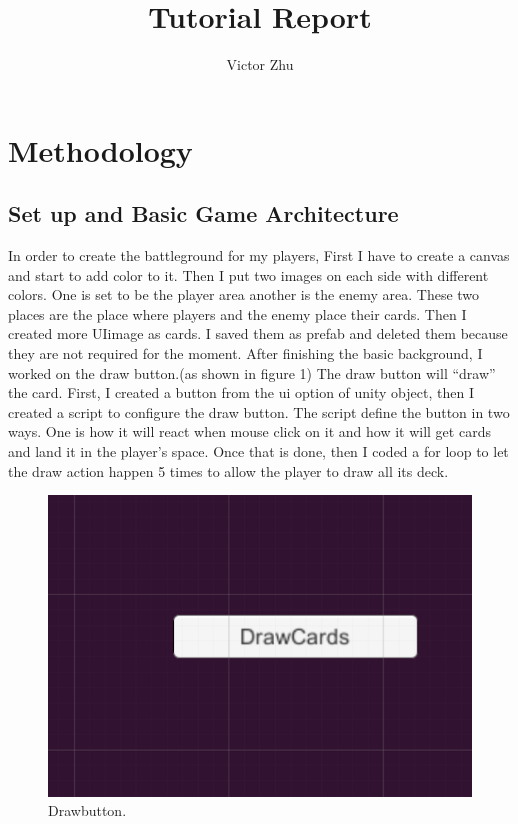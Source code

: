 \documentclass[10pt,twocolumn]{article}
\title{Tutorial Report}
\author{Victor Zhu}
\affiliation{Occidental College}
\begin{document}
\maketitle


\section{Methodology}

\subsection{Set up and Basic Game Architecture}
In order to create the battleground for my players, First I have to create a canvas and start to add color to it. Then I put two images on each side with different colors. One is set to be the player area another is the enemy area. These two places are the place where players and the enemy place their cards. Then I created more UIimage as cards. I saved them as prefab and deleted them because they are not required for the moment. 
After finishing the basic background, I worked on the draw button.(as shown in figure 1) The draw button will “draw” the card. First, I created a button from the ui option of unity object, then I created a script to configure the draw button. The script define the button in two ways. One is how it will react when mouse click on it and how it will get cards and land it in the player’s space. Once that is done, then I coded a for loop to let the draw action happen 5 times to allow the player to draw all its deck.  
\begin{figure}[ht]
  \includegraphics[width=\linewidth]{drawcardsbutton.png}
  \caption{Drawbutton.}
  \label{fig:Drawbutton}
\end{figure}
\end{document}
